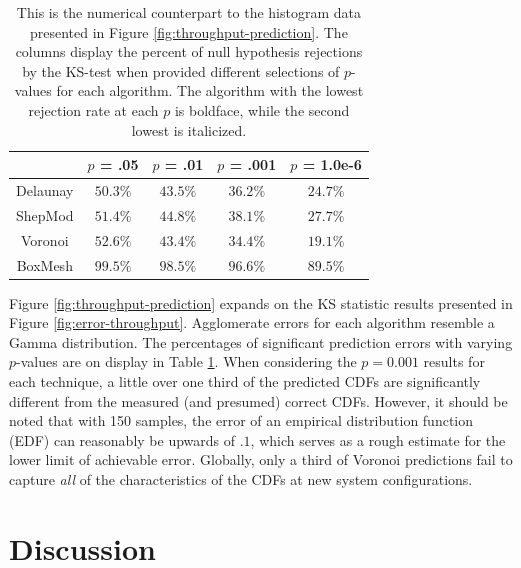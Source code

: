 \documentclass[smallextended,final]{svjour3}       %
\begin{document}
\begin{table}
  \renewcommand{\arraystretch}{1.3}
  \centering
  \begin{tabular}{c|c|c|c|c}
     & $p$ = .05 & $p$ = .01 & $p$ = .001 & $p$ = 1.0e-6\\
    \hline
    Delaunay & $\mathbf{50.3}\%$ & $\mathit{43.5}\%$ & $\mathit{36.2}\%$ & $\mathit{24.7}\%$\\
    ShepMod & $\mathit{51.4}\%$ & $44.8\%$ & $38.1\%$ & $27.7\%$\\
    Voronoi & $52.6\%$ & $\mathbf{43.4}\%$ & $\mathbf{34.4}\%$ & $\mathbf{19.1}\%$\\
    BoxMesh & $99.5\%$ & $98.5\%$ & $96.6\%$ & $89.5\%$\\
  \end{tabular}
  \caption{This is the numerical counterpart to the histogram data
    presented in Figure \ref{fig:throughput-prediction}. The columns
    display the percent of null hypothesis rejections by the KS-test
    when provided different selections of $p$-values for each
    algorithm. The algorithm with the lowest rejection rate at each
    $p$ is boldface, while the second lowest is italicized.}
  \label{table:null-hypothesis-results}
\end{table}



Figure \ref{fig:throughput-prediction} expands on the KS statistic
results presented in Figure \ref{fig:error-throughput}. Agglomerate
errors for each algorithm resemble a Gamma distribution. The
percentages of significant prediction errors with varying $p$-values
are on display in Table \ref{table:null-hypothesis-results}. When
considering the $p=0.001$ results for each technique, a little over
one third of the predicted CDFs are significantly different from the
measured (and presumed) correct CDFs. However, it should be noted that
with 150 samples, the error of an empirical distribution function
(EDF) can reasonably be upwards of $.1$, which serves as a rough
estimate for the lower limit of achievable error. Globally, only a
third of Voronoi predictions fail to capture \textit{all} of the
characteristics of the CDFs at new system configurations.

\section{Discussion}
\label{sec:discussion}
\end{document}
